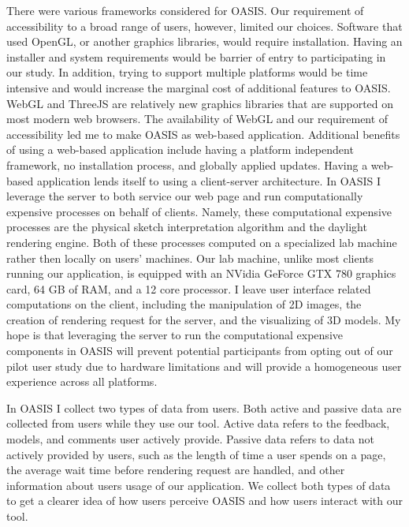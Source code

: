 There were various frameworks considered for OASIS.
Our requirement of accessibility to a broad range of users, however, limited our choices.
Software that used OpenGL, or another graphics libraries, would require installation.
Having an installer and system requirements would be barrier of entry to participating in our study.
In addition, trying to support multiple platforms would be time intensive and would increase the marginal cost of additional features to OASIS.
WebGL and ThreeJS are relatively new graphics libraries that are supported on most modern web browsers.
The availability of WebGL and our requirement of accessibility led me to make OASIS as web-based application.
Additional benefits of using a web-based application include having a platform independent framework, no installation process, and globally applied updates.
Having a web-based application lends itself to using a client-server architecture.
In OASIS I leverage the server to both service our web page and run computationally expensive processes on behalf of clients.
Namely, these computational expensive processes are the physical sketch interpretation algorithm and the daylight rendering engine.
Both of these processes computed on a specialized lab machine rather then locally on users' machines.
Our lab machine, unlike most clients running our application, is equipped with an NVidia GeForce GTX 780 graphics card, 64 GB of RAM, and a 12 core processor.
I leave user interface related computations on the client, including the manipulation of 2D images, the creation of rendering request for the server, and the visualizing of 3D models.
My hope is that leveraging the server to run the computational expensive components in OASIS will prevent potential participants from opting out of our pilot user study due to hardware limitations and will provide a homogeneous user experience across all platforms.


In OASIS I collect two types of data from users.
Both active and passive data are collected from users while they use our tool.
Active data refers to the feedback, models, and comments user actively provide.
Passive data refers to data not actively provided by users, such as the length of time a user spends on a page, the average wait time before rendering request are handled, and other information about users usage of our application. We collect both types of data to get a clearer idea of how users perceive OASIS and how users interact with our tool.

